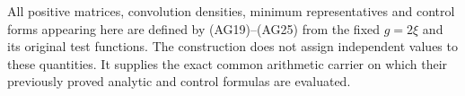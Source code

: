 All positive matrices, convolution densities, minimum representatives
and control forms appearing here are defined by (AG19)--(AG25)
from the fixed $g=2\xi$ and its original test functions.  The
construction does not assign independent values to these quantities.
It supplies the exact common arithmetic carrier on which their
previously proved analytic and control formulas are evaluated.
